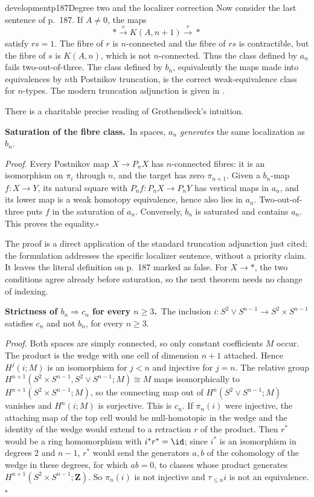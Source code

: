 \begin{dcomment}{development}{p187}{Degree two and the localizer correction}
Now consider the last sentence of p.~187. If $A\ne0$, the maps
\[
 *\xrightarrow{s}K(A,n+1)\xrightarrow{r}*
\]
satisfy $rs=1$. The fibre of $r$ is $n$-connected and the fibre of $rs$ is contractible, but the fibre of $s$ is $K(A,n)$, which is not $n$-connected. Thus the class defined by $a_n$ fails two-out-of-three. The class defined by $b_n$, equivalently the maps made into equivalences by $n$th Postnikov truncation, is the correct weak-equivalence class for $n$-types. The modern truncation adjunction is given in \citet[Proposition~5.5.6.18]{Lurie2009HTT}.

There is a charitable precise reading of Grothendieck's intuition.

\textbf{Saturation of the fibre class.}\ours\ In spaces, $a_n$ \emph{generates} the same localization as $b_n$.

\textit{Proof.} Every Postnikov map $X\to P_nX$ has $n$-connected fibres: it is an isomorphism on $\pi_i$ through $n$, and the target has zero $\pi_{n+1}$. Given a $b_n$-map $f:X\to Y$, its natural square with $P_nf:P_nX\to P_nY$ has vertical maps in $a_n$, and its lower map is a weak homotopy equivalence, hence also lies in $a_n$. Two-out-of-three puts $f$ in the saturation of $a_n$. Conversely, $b_n$ is saturated and contains $a_n$. This proves the equality.\hfill$\square$

The proof is a direct application of the standard truncation adjunction just cited; the formulation addresses the specific localizer sentence, without a priority claim. It leaves the literal definition on p.~187 marked as false. For $X\to *$, the two conditions agree already before saturation, so the next theorem needs no change of indexing.

\textbf{Strictness of $b_n\Rightarrow c_n$ for every $n\geq3$.}\ours\ The inclusion $i:S^2\vee S^{n-1}\to S^2\times S^{n-1}$ satisfies $c_n$ and not $b_n$, for every $n\geq3$.

\textit{Proof.} Both spaces are simply connected, so only constant coefficients $M$ occur. The product is the wedge with one cell of dimension $n+1$ attached. Hence $H^j(i;M)$ is an isomorphism for $j<n$ and injective for $j=n$. The relative group $H^{n+1}(S^2\times S^{n-1},S^2\vee S^{n-1};M)\cong M$ maps isomorphically to $H^{n+1}(S^2\times S^{n-1};M)$, so the connecting map out of $H^n(S^2\vee S^{n-1};M)$ vanishes and $H^n(i;M)$ is surjective. This is $c_n$. If $\pi_n(i)$ were injective, the attaching map of the top cell would be null-homotopic in the wedge and the identity of the wedge would extend to a retraction $r$ of the product. Then $r^*$ would be a ring homomorphism with $i^*r^*=\id$; since $i^*$ is an isomorphism in degrees $2$ and $n-1$, $r^*$ would send the generators $a,b$ of the cohomology of the wedge in these degrees, for which $ab=0$, to classes whose product generates $H^{n+1}(S^2\times S^{n-1};\mathbf Z)$. So $\pi_n(i)$ is not injective and $\tau_{\leq n}i$ is not an equivalence.\hfill$\square$


\end{dcomment}
